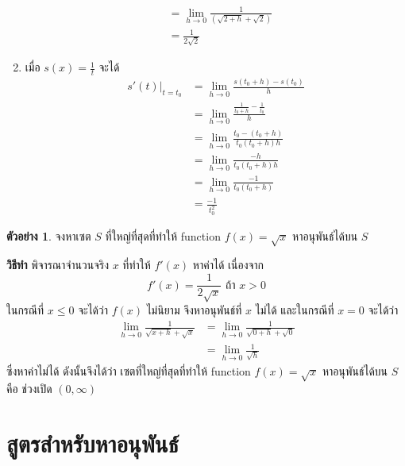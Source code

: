 \documentclass[
]{book}
\theoremstyle{definition}
\theoremstyle{definition}
\newtheorem{example}{ตัวอย่าง}[chapter]
\theoremstyle{definition}
\theoremstyle{definition}
\theoremstyle{remark}
\begin{document}
\begin{enumerate}
\begin{equation}
\begin{aligned}
                  &= \underset{h \rightarrow 0}{\lim}\frac{1}{(\sqrt{2+h} + \sqrt{2})} \\
                  &= \frac{1}{2\sqrt{2}}
    \end{aligned} \end{equation}
\item
  เมื่อ \(s(x) = \frac{1}{t}\) จะได้ \begin{equation}   \begin{aligned}
              s'(t)|_{t=t_0} &= \underset{h \rightarrow 0}{\lim}\frac{s(t_0+h) - s(t_0)}{h} \\
                  &= \underset{h \rightarrow 0}{\lim}\frac{\frac{1}{t_0+h}-\frac{1}{t_0}}{h} \\
                  &= \underset{h \rightarrow 0}{\lim}\frac{t_0-(t_0+h)}{t_0(t_0+h)h} \\
                  &= \underset{h \rightarrow 0}{\lim}\frac{-h}{t_0(t_0+h)h} \\
                  &= \underset{h \rightarrow 0}{\lim}\frac{-1}{t_0(t_0+h)} \\
                  &= \frac{-1}{t_0^2}
    \end{aligned} \end{equation}
\end{enumerate}

\begin{example}
จงหาเซต \(S\) ที่ใหญ่ที่สุดที่ทำให้ function \(f(x) = \sqrt{x}\) หาอนุพันธ์ได้บน \(S\)
\end{example}

\textbf{วิธีทำ} พิจารณาจำนวนจริง \(x\) ที่ทำให้ \(f'(x)\) หาค่าได้ เนื่องจาก
\[f'(x) = \frac{1}{2\sqrt{x}}  \text{ ถ้า } x>0\] ในกรณีที่ \(x \le 0\) จะได้ว่า
\(f(x)\) ไม่นิยาม จึงหาอนุพันธ์ที่ \(x\) ไม่ได้ และในกรณีที่ \(x=0\) จะได้ว่า
\begin{equation}   \begin{aligned}
    \underset{h \rightarrow 0}{\lim}\frac{1}{\sqrt{x+h}+\sqrt{x}}
    &=\underset{h \rightarrow 0}{\lim}\frac{1}{\sqrt{0+h}+\sqrt{0}} \\
    &=\underset{h \rightarrow 0}{\lim}\frac{1}{\sqrt{h}}
  \end{aligned} \end{equation} ซึ่งหาค่าไม่ได้ ดังนั้นจึงได้ว่า เซตที่ใหญ่ที่สุดที่ทำให้
function \(f(x) = \sqrt{x}\) หาอนุพันธ์ได้บน \(S\) คือ ช่วงเปิด \((0,\infty)\)

\section{สูตรสำหรับหาอนุพันธ์}\label{uxe2auxe15uxe23uxe2auxe33uxe2buxe23uxe1auxe2buxe32uxe2duxe19uxe1euxe19uxe18}
\end{document}
